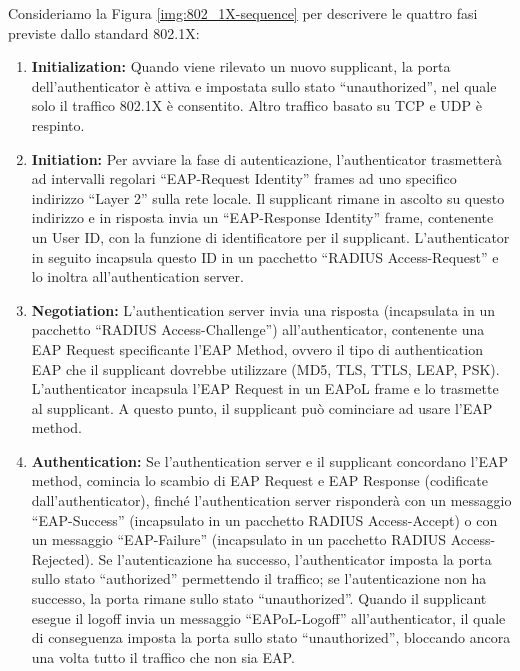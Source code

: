 Consideriamo la Figura \ref{img:802_1X-sequence} per descrivere le quattro fasi previste dallo standard 802.1X:
\begin{enumerate}
\item \textbf{Initialization:} Quando viene rilevato un nuovo supplicant, la porta dell'authenticator è attiva e impostata sullo stato “unauthorized”, nel quale solo il traffico 802.1X è consentito. Altro traffico basato su TCP e UDP è respinto.
\item \textbf{Initiation:} Per avviare la fase di autenticazione, l'authenticator trasmetterà ad intervalli regolari “EAP-Request Identity” frames ad uno specifico indirizzo “Layer 2” sulla rete locale. Il supplicant rimane in ascolto su questo indirizzo e in risposta invia un “EAP-Response Identity” frame, contenente un User ID, con la funzione di identificatore per il supplicant. L'authenticator in seguito incapsula questo ID in un pacchetto “RADIUS Access-Request” e lo inoltra all'authentication server.
\item \textbf{Negotiation:} L'authentication server invia una risposta (incapsulata in un pacchetto “RADIUS Access-Challenge”) all'authenticator, contenente una EAP Request specificante l'EAP Method, ovvero il tipo di authentication EAP che il supplicant dovrebbe utilizzare (MD5, TLS, TTLS, LEAP, PSK). L'authenticator incapsula l'EAP Request in un EAPoL frame e lo trasmette al supplicant.  A questo punto, il supplicant può cominciare ad usare l'EAP method.
\item \textbf{Authentication:} Se l'authentication server e il supplicant concordano l'EAP method, comincia lo scambio di EAP Request e EAP Response (codificate dall'authenticator), finché l'authentication server risponderà con un messaggio “EAP-Success” (incapsulato in un pacchetto RADIUS Access-Accept) o con un messaggio “EAP-Failure” (incapsulato in un pacchetto RADIUS Access-Rejected). Se l'autenticazione ha successo, l'authenticator imposta la porta sullo stato “authorized” permettendo il traffico; se l'autenticazione non ha successo, la porta rimane sullo stato “unauthorized”. Quando il supplicant esegue il logoff invia un messaggio “EAPoL-Logoff” all'authenticator, il quale di conseguenza imposta la porta sullo stato “unauthorized”, bloccando ancora una volta tutto il traffico che non sia EAP.
\end{enumerate}

